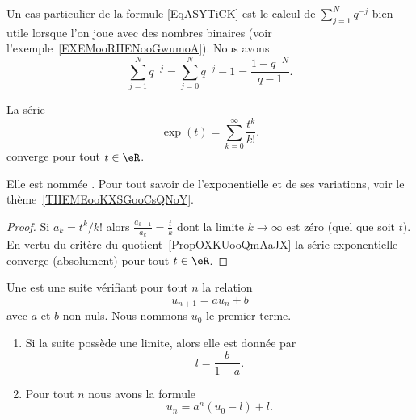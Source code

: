 Un cas particulier de la formule \eqref{EqASYTiCK} est le calcul de \( \sum_{j=1}^{N}q^{-j}\) bien utile lorsque l'on joue avec des nombres binaires (voir l'exemple~\ref{EXEMooRHENooGwumoA}). Nous avons
\begin{equation}        \label{EQooFMBAooEJkHWT}
	\sum_{j=1}^Nq^{-j}=\sum_{j=0}^Nq^{-j}-1=\frac{ 1-q^{-N} }{ q-1 }.
\end{equation}


\begin{lemma} \label{ExIJMHooOEUKfj}
	La série
	\begin{equation}
		\exp(t)=\sum_{k=0}^{\infty}\frac{ t^k }{ k! }.
	\end{equation}
	converge pour tout \( t\in \eR\).

	Elle est nommée . Pour tout savoir de l'exponentielle et de ses variations, voir le thème~\ref{THEMEooKXSGooCsQNoY}.
\end{lemma}

\begin{proof}
	Si \( a_k=t^k/k!\) alors \( \frac{ a_{k+1} }{ a_k }=\frac{ t }{ k }\) dont la limite \( k\to \infty\) est zéro (quel que soit \( t\)). En vertu du critère du quotient~\ref{PropOXKUooQmAaJX} la série exponentielle converge (absolument) pour tout \( t\in \eR\).
\end{proof}

\begin{lemma}      \label{LEMooCVIQooUtuzgE}
	Une  est une suite vérifiant pour tout \( n\) la relation
	\begin{equation}
		u_{n+1}=au_n+b
	\end{equation}
	avec \( a\) et \( b\) non nuls. Nous nommons \( u_0\) le premier terme.

	\begin{enumerate}
		\item
		      Si la suite possède une limite, alors elle est donnée par
		      \begin{equation}    \label{EQooMZSSooOWpZUp}
			      l=\frac{ b }{ 1-a }.
		      \end{equation}
		\item
		      Pour tout \( n\) nous avons la formule
		      \begin{equation}
			      u_n=a^n(u_0-l)+l.
		      \end{equation}
	\end{enumerate}
\end{lemma}


